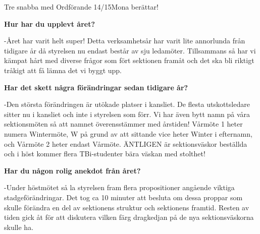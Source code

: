 \begin{news}{4}{Tre snabba med Ordförande 14/15}{Mona berättar!}{}{}

  \noindent \textbf{Hur har du upplevt året?}  
  
  -Året har varit helt super! Detta
  verksamhetsår har varit lite annorlunda från tidigare år då
  styrelsen nu endast består av sju ledamöter. Tillsammans så har vi
  kämpat hårt med diverse frågor som fört sektionen framåt och det ska
  bli riktigt tråkigt att få lämna det vi byggt upp.

  \noindent \textbf{Har det skett några förändringar sedan tidigare år?}  
  
  -Den
  största förändringen är utökade platser i kansliet. De flesta
  utskottsledare sitter nu i kansliet och inte i styrelsen som
  förr. Vi har även bytt namn på våra sektionsmöten så att namnet
  överensstämmer med årstiden!  Vårmöte 1 heter numera Wintermöte, W
  på grund av att sittande vice heter Winter i efternamn, och Vårmöte
  2 heter endast Vårmöte. ÄNTLIGEN är sektionsväskor beställda och i
  höst kommer flera TBi-studenter bära väskan med stolthet!

  \noindent \textbf{Har du någon rolig anekdot från året?}  
  
  -Under höstmötet så
  la styrelsen fram flera propositioner angående viktiga
  stadgeförändringar. Det tog ca 10 minuter att besluta om dessa
  proppar som skulle förändra en del av sektionens struktur och
  sektionens framtid. Resten av tiden gick åt för att diskutera vilken
  färg dragkedjan på de nya sektionsväskorna skulle ha.


\end{news}
